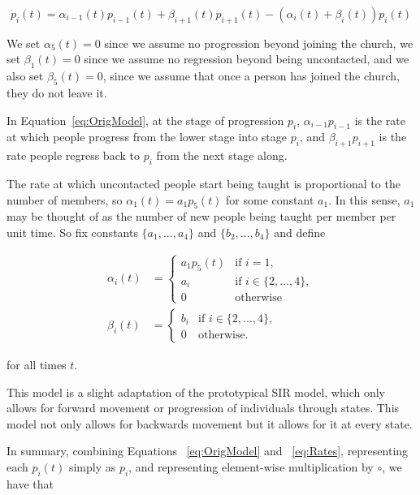 \documentclass[11pt]{amsart}
\begin{document}
\begin{equation}
\dot{p}_i(t) = \alpha_{i-1}(t) p_{i-1}(t) + \beta_{i+1}(t) p_{i+1}(t) - (\alpha_i(t) + \beta_i(t)) p_i(t)
\label{eq:OrigModel}
\end{equation}

We set $\alpha_5(t) = 0$ since we assume no progression beyond joining the church, we set $\beta_1(t) = 0$ since we assume no regression beyond being uncontacted, and we also set $\beta_5(t) = 0$, since we assume that once a person has joined the church, they do not leave it.

In Equation~\ref{eq:OrigModel}, at the stage of progression $p_i$, $\alpha_{i-1} p_{i-1}$ is the rate at which people progress from the lower stage into stage $p_i$, and $\beta_{i+1} p_{i+1}$ is the rate people regress back to $p_i$ from the next stage along.

The rate at which uncontacted people start being taught is proportional to the number of members, so $\alpha_1(t) = a_1 p_5(t)$ for some constant $a_1$. In this sense, $a_1$ may be thought of as the number of new people being taught per member per unit time. So fix constants $\{a_1, ..., a_4\}$ and $\{b_2, ..., b_4\}$ and define

\begin{equation}
\begin{aligned}
    \alpha_i(t) &= \begin{cases} 
    a_1 p_5(t) & \text{if } i = 1, \\
    a_i & \text{if } i \in \{2, ..., 4\}, \\
    0 & \text{otherwise}
    \end{cases} \\
    \beta_i(t) &= \begin{cases} 
    b_i & \text{if } i \in \{2, ..., 4\}, \\
    0 & \text{otherwise}.
    \end{cases}
\end{aligned}
\label{eq:Rates}
\end{equation}


for all times $t$.

This model is a slight adaptation of the prototypical SIR model, which only allows for forward movement or progression of individuals through states. This model not only allows for backwards movement but it allows for it at every state. 

In summary, combining Equations ~\ref{eq:OrigModel} and ~\ref{eq:Rates}, representing each $p_i(t)$ simply as $p_i$, and representing element-wise multiplication by $\circ$, we have that
\end{document}
